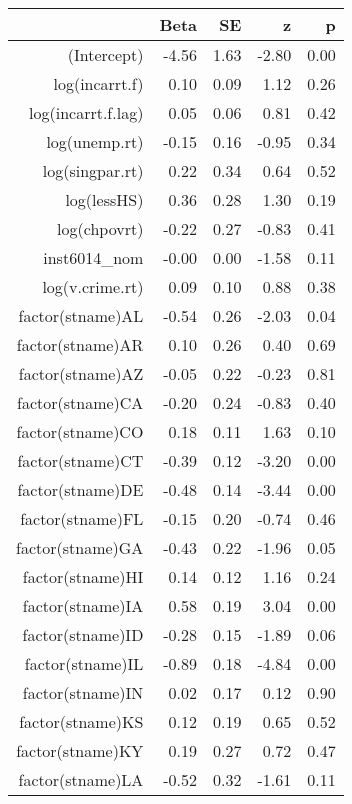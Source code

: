 \begin{table}[ht]
\centering
\begin{tabular}{rrrrr}
  \hline
 & Beta & SE & z & p \\ 
  \hline
(Intercept) & -4.56 & 1.63 & -2.80 & 0.00 \\ 
  log(incarrt.f) & 0.10 & 0.09 & 1.12 & 0.26 \\ 
  log(incarrt.f.lag) & 0.05 & 0.06 & 0.81 & 0.42 \\ 
  log(unemp.rt) & -0.15 & 0.16 & -0.95 & 0.34 \\ 
  log(singpar.rt) & 0.22 & 0.34 & 0.64 & 0.52 \\ 
  log(lessHS) & 0.36 & 0.28 & 1.30 & 0.19 \\ 
  log(chpovrt) & -0.22 & 0.27 & -0.83 & 0.41 \\ 
  inst6014\_nom & -0.00 & 0.00 & -1.58 & 0.11 \\ 
  log(v.crime.rt) & 0.09 & 0.10 & 0.88 & 0.38 \\ 
  factor(stname)AL & -0.54 & 0.26 & -2.03 & 0.04 \\ 
  factor(stname)AR & 0.10 & 0.26 & 0.40 & 0.69 \\ 
  factor(stname)AZ & -0.05 & 0.22 & -0.23 & 0.81 \\ 
  factor(stname)CA & -0.20 & 0.24 & -0.83 & 0.40 \\ 
  factor(stname)CO & 0.18 & 0.11 & 1.63 & 0.10 \\ 
  factor(stname)CT & -0.39 & 0.12 & -3.20 & 0.00 \\ 
  factor(stname)DE & -0.48 & 0.14 & -3.44 & 0.00 \\ 
  factor(stname)FL & -0.15 & 0.20 & -0.74 & 0.46 \\ 
  factor(stname)GA & -0.43 & 0.22 & -1.96 & 0.05 \\ 
  factor(stname)HI & 0.14 & 0.12 & 1.16 & 0.24 \\ 
  factor(stname)IA & 0.58 & 0.19 & 3.04 & 0.00 \\ 
  factor(stname)ID & -0.28 & 0.15 & -1.89 & 0.06 \\ 
  factor(stname)IL & -0.89 & 0.18 & -4.84 & 0.00 \\ 
  factor(stname)IN & 0.02 & 0.17 & 0.12 & 0.90 \\ 
  factor(stname)KS & 0.12 & 0.19 & 0.65 & 0.52 \\ 
  factor(stname)KY & 0.19 & 0.27 & 0.72 & 0.47 \\ 
  factor(stname)LA & -0.52 & 0.32 & -1.61 & 0.11 \\ 

\end{tabular}
\end{table}
